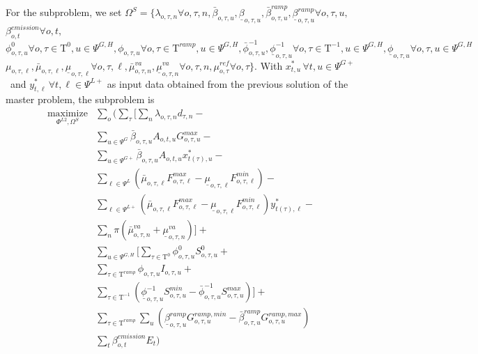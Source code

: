 \documentclass[final]{IEEEtran}
\newcommand{\Tau}{\mathrm{T}}
\begin{document}
For the subproblem, we set $\Omega^{S} = \{ \lambda_{o, \tau, n} \forall o, \tau, n, \bar{\beta}_{o, \tau, u}, \underline{\beta}_{o, \tau, u}, \bar{\beta}_{o, \tau, u}^{ramp}, \underline{\beta}_{o, \tau, u}^{ramp} \forall o, \tau, u,$ $\beta_{o, t}^{emission} \forall o, t,$ $\phi_{o, \tau, u}^{0} \forall o, \tau \in \Tau^0, u \in \Psi^{G, H}, \phi_{o, \tau, u} \forall o, \tau \in \Tau^{ramp}, u \in \Psi^{G, H}, \bar{\phi}_{o, \tau, u}^{-1}, \underline{\phi}_{o, \tau, u}^{-1} \forall o, \tau \in \Tau^{-1}, u \in \Psi^{G, H}, \underline{\phi}_{o, \tau, u} \forall o, \tau, u \in \Psi^{G, H}$ $\mu_{o, \tau, \ell}, \bar{\mu}_{o, \tau, \ell}, \underline{\mu}_{o, \tau, \ell} \forall o, \tau, \ell, \bar{\mu}^{va}_{o, \tau, n}, \underline{\mu}^{va}_{o, \tau, n} \forall o, \tau, n, \mu^{ref}_{o, \tau}  \forall o, \tau \}$. With $x_{t, u}^* \, \forall t, u \in \Psi^{G+}$ and $y_{t, \ell}^* \, \forall t, \ell \in \Psi^{L+}$ as input data obtained from the previous solution of the master problem, the subproblem is
\begin{align}
\label{sub_obj} \underset{\Phi^{L2}, \Omega^{S}}{\text{maximize}} &\sum\limits_o \Bigg( \sum\limits_{\tau} \Big[ \sum\limits_n \lambda_{o, \tau, n} d_{\tau, n} - \nonumber \\
&\sum\limits_{u \in \Psi^G} \bar{\beta}_{o, \tau, u} A_{o, t, u} G_{o, \tau, u}^{max} - \nonumber \\
&\sum\limits_{u \in \Psi^{G+}} \bar{\beta}_{o, \tau, u} A_{o, t, u} x_{t(\tau), u}^* - \nonumber \\
&\sum\limits_{\ell \in \Psi^L} \left( \bar{\mu}_{o, \tau, \ell} F_{o, \tau, \ell}^{max} - \underline{\mu}_{o, \tau, \ell} F_{o, \tau, \ell}^{min} \right) - \nonumber \\
&\sum\limits_{\ell \in \Psi^{L+}} \left( \bar{\mu}_{o, \tau, \ell} F_{o, \tau, \ell}^{max} - \underline{\mu}_{o, \tau, \ell} F_{o, \tau, \ell}^{min} \right) y_{t(\tau), \ell}^* - \nonumber \\
&\sum\limits_{n} \pi ( \bar{\mu}^{va}_{o, \tau, n} + \underline{\mu}^{va}_{o, \tau, n} ) \Big] + \nonumber \\
&\sum\limits_{u \in \Psi^{G, H}} \Big[ \sum\limits_{\tau \in \Tau^{0}}  \phi_{o, \tau, u}^{0} S^{0}_{o, \tau, u} + \nonumber \\
&\sum\limits_{\tau \in \Tau^{ramp}} \phi_{o, \tau, u} I_{o, \tau, u} + \nonumber \\
&\sum\limits_{\tau \in \Tau^{-1}} \left( \underline{\phi}^{-1}_{o, \tau, u} S^{min}_{o, \tau, u} - \bar{\phi}^{-1}_{o, \tau, u} S^{max}_{o, \tau, u} \right) \Big] + \nonumber \\
&\sum\limits_{\tau \in \Tau^{ramp}} \sum\limits_{u} \left( \underline{\beta}_{o, \tau, u}^{ramp} G^{ramp,min}_{o, \tau, u} - \bar{\beta}_{o, \tau, u}^{ramp} G^{ramp,max}_{o, \tau, u} \right) \nonumber \\
&\sum\limits_{t} \beta_{o, t}^{emission} E_{t} \Bigg)
\end{align}
\end{document}
